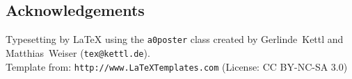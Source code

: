\documentclass[a0,portrait]{a0poster}
\begin{document}
\begin{multicols}{2}


\subsection*{Acknowledgements}

\small{Typesetting by {\LaTeX} using the \texttt{a0poster} class
created by Gerlinde~Kettl and Matthias~Weiser (\texttt{tex@kettl.de}).\\
Template from: \texttt{http://www.LaTeXTemplates.com} (License: CC BY-NC-SA 3.0)}


\end{multicols}
\end{document}
